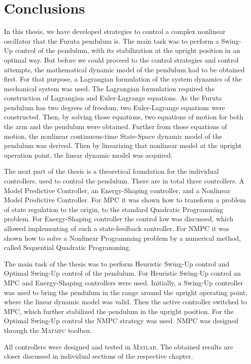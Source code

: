 \chapter{Conclusions}
In this thesis, we have developed strategies to control a complex nonlinear oscillator that the Furuta pendulum is. The main task was to perform a Swing-Up control of the pendulum, with its stabilization at the upright position in an optimal way. But before we could proceed to the control strategies and control attempts, the mathematical dynamic model of the pendulum had to be obtained first. For that purpose, a Lagrangian formulation of the system dynamics of the mechanical system was used. The Lagrangian formulation required the construction of Lagrangian and Euler-Lagrange equations. As the Furuta pendulum has two degrees of freedom, two Euler-Lagrange equations were constructed. Then, by solving those equations, two equations of motion for both the arm and the pendulum were obtained. Further from those equations of motion, the nonlinear continuous-time State-Space dynamic model of the pendulum was derived. Then by linearizing that nonlinear model at the upright operation point, the linear dynamic model was acquired.

The next part of the thesis is a theoretical foundation for the individual controllers, used to control the pendulum. There are in total three controllers. A Model Predictive Controller, an Energy-Shaping controller, and a Nonlinear Model Predictive Controller. For MPC it was shown how to transform a problem of state regulation to the origin, to the standard Quadratic Programming problem. For Energy-Shaping controller the control law was discussed, which allowed implementing of such a state-feedback controller. For NMPC it was shown how to solve a Nonlinear Programming problem by a numerical method, called Sequential Quadratic Programming.

The main task of the thesis was to perform Heuristic Swing-Up control and Optimal Swing-Up control of the pendulum. For Heuristic Swing-Up control an MPC and Energy-Shaping controllers were used. Initially, a Swing-Up controller was used to bring the pendulum in the range around the upright operating point, where the linear dynamic model was valid. Then the active controller switched to MPC, which further stabilized the pendulum in the upright position. For the Optimal Swing-Up control the NMPC strategy was used. NMPC was designed through the \textsc{Matmpc} toolbox.

All controllers were designed and tested in \textsc{Matlab}. The obtained results are closer discussed in individual sections of the respective chapter.